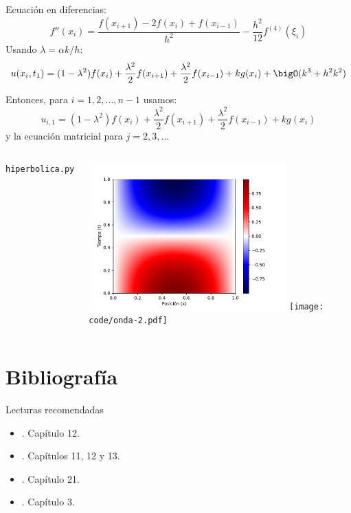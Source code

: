 \documentclass[9pt, aspectratio=169]{beamer}
\begin{document}
\begin{frame}
Ecuación en diferencias:
\[ f''(x_i) = \frac{f(x_{i+1}) - 2 f(x_i) + f(x_{i-1})}{h^2} - \frac{h^2}{12} f^{(4)}(\xi_i) \]
Usando $\lambda = \alpha k / h$:
\[ u(x_i, t_1) = (1-\lambda^2)f(x_i) + \frac{\lambda^2}{2} f(x_{i+1}) + \frac{\lambda^2}{2} f(x_{i-1}) + k g(x_i) + \bigO(k^3 + h^2 k^2) \]

Entonces, para $i = 1, 2, \ldots, n-1$ usamos:
\[ u_{i, 1} = (1-\lambda^2)f(x_i) + \frac{\lambda^2}{2} f(x_{i+1}) + \frac{\lambda^2}{2} f(x_{i-1}) + k g(x_i) \]
y la ecuación matricial para $j = 2, 3, \ldots$

\end{frame}

\begin{frame}
\begin{columns}
\texttt{hiperbolica.py} \vspace{-1em}
\pause

\begin{center}
    \includegraphics[width=0.75\textwidth]{code/onda-1.pdf}
    \texttt{[image: code/onda-2.pdf]}
\end{center}
\end{columns}
\end{frame}

\section*{Bibliografía}
\begin{frame}[allowframebreaks]{Lecturas recomendadas}
\begin{itemize}
    \item {}. Capítulo 12.
    \item {}. Capítulos 11, 12 y 13.
\item {}. Capítulo 21.
    \item {}. Capítulo 3.
\end{itemize}
\end{frame}
\end{document}
